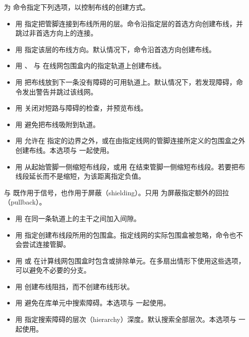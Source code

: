 为  命令指定下列选项，以控制布线的创建方式。
\begin{itemize}
  \item 用  指定把管脚连接到布线所用的层。命令沿指定层的首选方向创建布线，并跳过非首选方向上的连接。
  \item 用  指定该层的布线方向。默认情况下，命令沿首选方向创建布线。
  \item 用 、 与  在线网包围盒内的指定轨道上创建布线。
  \item 用  把布线放到下一条没有障碍的可用轨道上。默认情况下，若发现障碍，命令发出警告并跳过该线网。
  \item 用  关闭对短路与障碍的检查，并预览布线。
  \item 用  避免把布线吸附到轨道。
  \item 用  允许在  指定的边界之外，或在由指定线网的管脚连接所定义的包围盒之外创建布线。本选项与  一起使用。
  \item 用  从起始管脚一侧缩短布线段，或用  在结束管脚一侧缩短布线段。若要把布线段延长而不是缩短，为该距离指定负值。
\end{itemize}

 与  既作用于信号，也作用于屏蔽（shielding）。只用  为屏蔽指定额外的回拉（pullback）。
\begin{itemize}
  \item 用  在同一条轨道上的主干之间加入间隙。
  \item 用  指定创建布线段所用的包围盒。指定线网的实际包围盒被忽略，命令也不会尝试连接管脚。
  \item 用  或  在计算线网包围盒时包含或排除单元。在多扇出情形下使用这些选项，可以避免不必要的分支。
  \item 用  创建布线阻挡，而不创建布线形状。
  \item 用  避免在库单元中搜索障碍。本选项与  一起使用。
  \item 用  指定搜索障碍的层次（hierarchy）深度。默认搜索全部层次。本选项与  一起使用。
\end{itemize}

